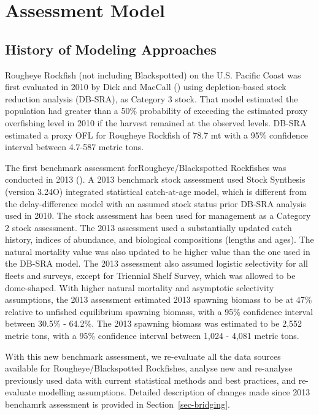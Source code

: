 \documentclass[
]{scrartcl}
\begin{document}
\newpage{}

\section{Assessment Model}\label{assessment-model}

\subsection{History of Modeling
Approaches}\label{history-of-modeling-approaches}

Rougheye Rockfish (not including Blackspotted) on the U.S. Pacific Coast
was first evaluated in 2010 by Dick and MacCall
() using depletion-based stock
reduction analysis (DB-SRA), as Category 3 stock. That model estimated
the population had greater than a 50\% probability of exceeding the
estimated proxy overfishing level in 2010 if the harvest remained at the
observed levels. DB-SRA estimated a proxy OFL for Rougheye Rockfish of
78.7 mt with a 95\% confidence interval between 4.7-587 metric tons.

The first benchmark assessment forRougheye/Blackspotted Rockfishes was
conducted in 2013 (). A 2013 benchmark stock assessment used Stock Synthesis
(version 3.24O) integrated statistical catch-at-age model, which is
different from the delay-difference model with an assumed stock status
prior DB-SRA analysis used in 2010. The stock assessment has been used
for management as a Category 2 stock assessment. The 2013 assessment
used a substantially updated catch history, indices of abundance, and
biological compositions (lengths and ages). The natural mortality value
was also updated to be higher value than the one used in the DB-SRA
model. The 2013 assessment also assumed logistic selectivity for all
fleets and surveys, except for Triennial Shelf Survey, which was allowed
to be dome-shaped. With higher natural mortality and asymptotic
selectivity assumptions, the 2013 assessment estimated 2013 spawning
biomass to be at 47\% relative to unfished equilibrium spawning biomass,
with a 95\% confidence interval between 30.5\% - 64.2\%. The 2013
spawning biomass was estimated to be 2,552 metric tons, with a 95\%
confidence interval between 1,024 - 4,081 metric tons.

With this new benchmark assessment, we re-evaluate all the data sources
available for Rougheye/Blackspotted Rockfishes, analyse new and
re-analyse previously used data with current statistical methods and
best practices, and re-evaluate modelling assumptions. Detailed
description of changes made since 2013 benchamrk assessment is provided
in Section~\ref{sec-bridging}.
\end{document}
